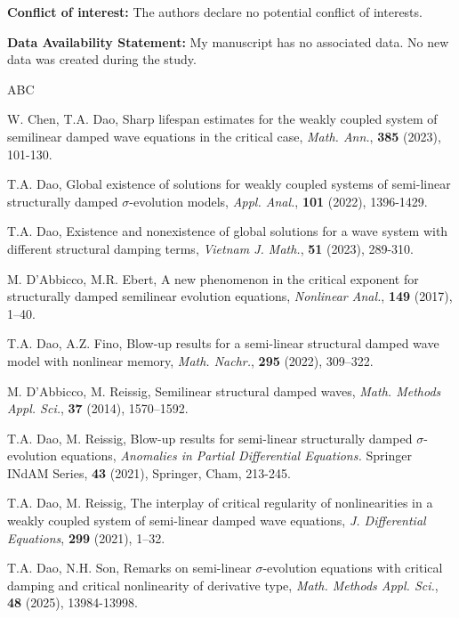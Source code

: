 \documentclass[11pt,reqno]{amsart}
\numberwithin{equation}{section}
\theoremstyle{plain}
\begin{document}
\textbf{Conflict of interest:} The authors declare no potential conflict of interests.\medskip

\textbf{Data Availability Statement:} My manuscript has no associated data. No new data was created during the study.


\begin{thebibliography}{ABC}


 W. Chen, T.A. Dao, Sharp lifespan estimates for the weakly coupled system of semilinear damped wave equations in the critical case, \textit{Math. Ann.}, \textbf{385} (2023), 101-130.

 T.A. Dao, Global existence of solutions for weakly coupled systems of semi-linear structurally damped $\sigma$-evolution models, \textit{Appl. Anal.}, \textbf{101} (2022), 1396-1429.

 T.A. Dao, Existence and nonexistence of global solutions for a wave system with different structural damping terms, \textit{Vietnam J. Math.}, \textbf{51} (2023), 289-310.

 M. D’Abbicco, M.R. Ebert, A new phenomenon in the critical exponent for structurally damped semilinear evolution equations, \textit{Nonlinear Anal.}, \textbf{149} (2017), 1–40.

 T.A. Dao, A.Z. Fino, Blow-up results for a semi-linear structural damped wave model with nonlinear memory, \textit{Math. Nachr.}, \textbf{295} (2022), 309–322.

 M. D’Abbicco, M. Reissig, Semilinear structural damped waves, \textit{Math. Methods Appl. Sci.}, \textbf{37} (2014), 1570–1592.

 T.A. Dao, M. Reissig, Blow-up results for semi-linear structurally damped $\sigma$-evolution equations, \textit{Anomalies in Partial Differential Equations.} Springer INdAM Series, \textbf{43} (2021), Springer, Cham, 213-245.

 T.A. Dao, M. Reissig, The interplay of critical regularity of nonlinearities in a weakly coupled system of semi-linear damped wave equations, \textit{J. Differential Equations}, \textbf{299} (2021), 1–32.

 T.A. Dao, N.H. Son, Remarks on semi-linear $\sigma$-evolution equations with critical damping and critical nonlinearity of derivative type, \textit{Math. Methods Appl. Sci.}, \textbf{48} (2025), 13984-13998.


\end{thebibliography}
\end{document}
